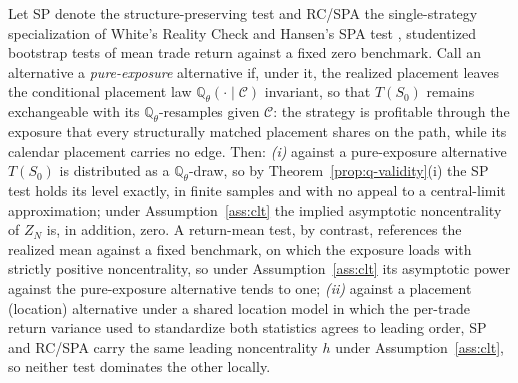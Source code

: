 \documentclass[risks,article,submit,pdftex,oneauthor]{Definitions/mdpi}
\begin{document}
\begin{Theorem}
\label{prop:orthogonality}
Let SP denote the structure-preserving test and RC/SPA the single-strategy
specialization of White's Reality Check \citep{white2000} and Hansen's SPA test
\citep{hansen2005}, studentized bootstrap tests of mean trade return against a
fixed zero benchmark. Call an alternative a \emph{pure-exposure} alternative if,
under it, the realized placement leaves the conditional placement law
$\mathbb{Q}_\theta(\cdot\mid\mathcal C)$ invariant, so that $T(S_0)$ remains
exchangeable with its $\mathbb{Q}_\theta$-resamples given $\mathcal C$: the
strategy is profitable through the exposure that every structurally matched
placement shares on the path, while its calendar placement carries no edge. Then:
\emph{(i)} against a pure-exposure alternative $T(S_0)$ is distributed as a
$\mathbb{Q}_\theta$-draw, so by Theorem~\ref{prop:q-validity}(i) the SP test holds
its level exactly, in finite samples and with no appeal to a central-limit
approximation; under Assumption~\ref{ass:clt} the implied asymptotic noncentrality
of $Z_N$ is, in addition, zero. A return-mean test, by contrast, references the
realized mean against a fixed benchmark, on which the exposure loads with strictly
positive noncentrality, so under Assumption~\ref{ass:clt} its asymptotic power
against the pure-exposure alternative tends to one;
\emph{(ii)} against a placement (location) alternative under a shared location
model in which the per-trade return variance used to standardize both statistics
agrees to leading order, SP and RC/SPA carry the same leading noncentrality $h$
under Assumption~\ref{ass:clt}, so neither test dominates the other locally.
\end{Theorem}
\end{document}
